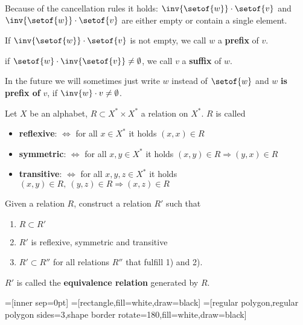 Because of the cancellation rules it holds: $\inv{\setof{w}} \cdot \setof{v}$
and $\inv{\setof{w}} \cdot \setof{v}$ are either empty or contain a single
element.

If $\inv{\setof{w}} \cdot \setof{v}$ is not empty, we call $w$ a {\bf
prefix} of $v$.

if $\setof{w} \cdot \inv{\setof{v}} \neq \emptyset$, we call $v$ a {\bf suffix}
of $w$.

In the future we will sometimes just write $w$ instead of $\setof{w}$ and
$w$ {\bf is prefix of} $v$, if $\inv{w} \cdot v \neq \emptyset$.

\bigskip
\begin{exercise}
Let $X$ be an alphabet, $R \subset X^* \times X^*$ a relation on $X^*$. $R$ is
called
\begin{itemize}
  \item {\bf reflexive}: $\Leftrightarrow$ for all $x \in X^*$ it holds $(x, x)
  \in R$
  \item {\bf symmetric}: $\Leftrightarrow$ for all $x, y \in X^*$ it holds $(x,
  y) \in R \Rightarrow (y, x) \in R$
  \item {\bf transitive}: $\Leftrightarrow$ for all $x, y, z \in X^*$ it holds
  $(x, y) \in R,\ (y, z) \in R \Rightarrow (x, z) \in R$
\end{itemize}

Given a relation $R$, construct a relation $R'$ such that
\begin{enumerate}
  \item $R \subset R'$
  \item $R'$ is reflexive, symmetric and transitive
  \item $R' \subset R''$ for all relations $R''$ that fulfill 1) and 2).
\end{enumerate}

$R'$ is called the {\bf equivalence relation} generated by $R$. 
\end{exercise}


=[inner sep=0pt]
=[rectangle,fill=white,draw=black]
=[regular polygon,regular polygon sides=3,shape border
rotate=180,fill=white,draw=black]

